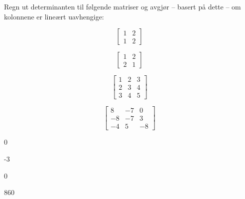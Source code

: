 \begin{oppgave}
Regn ut determinanten til følgende matriser og avgjør -- basert på dette -- om kolonnene er lineært uavhengige:
\begin{punkt}
$$\begin{bmatrix}
1 & 2\\
1 & 2
\end{bmatrix}$$
\end{punkt}

\begin{punkt}
$$\begin{bmatrix}
1 & 2\\
2 & 1
\end{bmatrix}$$
\end{punkt}

\begin{punkt}
$$\begin{bmatrix}
1 & 2 & 3\\
2 & 3 & 4\\
3 & 4 & 5
\end{bmatrix}$$
\end{punkt}

\begin{punkt}
$$\begin{bmatrix}
8 & -7 & 0\\
-8 & -7 & 3\\
-4 & 5 & -8
\end{bmatrix}$$
\end{punkt}

\end{oppgave}

\begin{losning}

\begin{punkt}
0
\end{punkt}

\begin{punkt}
-3
\end{punkt}

\begin{punkt}
0
\end{punkt}

\begin{punkt}
860
\end{punkt}

\end{losning}


